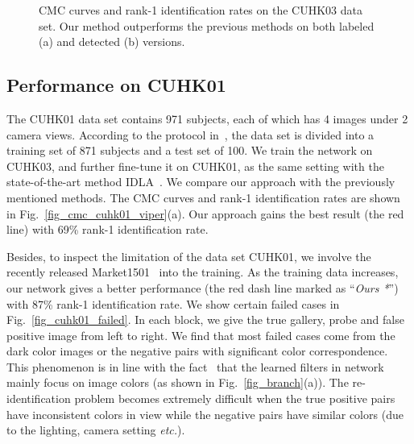\documentclass[runningheads]{llncs}
\begin{document}
\begin{figure*}[!htbp]
  \centering

  \caption{CMC curves and rank-1 identification rates on the CUHK03 data set. Our method outperforms the previous methods on both labeled (a) and detected (b) versions.}
  \label{fig_cmc_cuhk03}
\end{figure*}


\subsection{Performance on CUHK01}
\label{section_Performance on CUHK01}

The CUHK01 data set contains 971 subjects, each of which has 4 images under 2 camera views.
According to the protocol in~\cite{li2012human}, the data set is divided into a training set of 871 subjects and a test set of 100.
We train the network on CUHK03, and further fine-tune it on CUHK01, as the same setting with the state-of-the-art method IDLA~\cite{ahmed2015improved}.
We compare our approach with the previously mentioned methods. The CMC curves and rank-1 identification rates are shown in Fig.~\ref{fig_cmc_cuhk01_viper}(a).
Our approach gains the best result (the red line) with 69\% rank-1 identification rate.

Besides, to inspect the limitation of the data set CUHK01, we involve the recently released Market1501~\cite{zheng2015scalable} into the training. As the training data increases, our network gives a better performance (the red dash line marked as ``\emph{Ours *}'') with 87\% rank-1 identification rate.
We show certain failed cases in Fig.~\ref{fig_cuhk01_failed}. In each block, we give the true gallery, probe and false positive image from left to right.
We find that most failed cases come from the dark color images or the negative pairs with significant color correspondence.
This phenomenon is in line with the fact~\cite{ahmed2015improved} that the learned filters in network mainly focus on image colors (as shown in Fig.~\ref{fig_branch}(a)).
The re-identification problem becomes extremely difficult when the true positive pairs have inconsistent colors in view while the negative pairs have similar colors (due to the lighting, camera setting \emph{etc.}).
\end{document}
